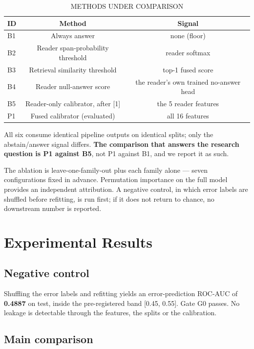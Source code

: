 \documentclass[conference]{IEEEtran}
\begin{document}
\begin{table}[t]\centering\caption{METHODS UNDER COMPARISON}\label{tab:3}\footnotesize
\begin{tabular}{lcc}\hline
\textbf{ID} & \textbf{Method} & \textbf{Signal} \\ \hline
B1 & Always answer & none (floor) \\
B2 & Reader span-probability threshold & reader softmax \\
B3 & Retrieval similarity threshold & top-1 fused score \\
B4 & Reader null-answer score & the reader's own trained no-answer head \\
B5 & Reader-only calibrator, after [1] & the 5 reader features \\
P1 & Fused calibrator (evaluated) & all 16 features \\
\hline\end{tabular}\end{table}

All six consume identical pipeline outputs on identical splits; only the abstain/answer signal differs. \textbf{The comparison that answers the research question is P1 against B5}, not P1 against B1, and we report it as such.

The ablation is leave-one-family-out plus each family alone --- seven configurations fixed in advance. Permutation importance on the full model provides an independent attribution. A negative control, in which error labels are shuffled before refitting, is run first; if it does not return to chance, no downstream number is reported.

\section{Experimental Results}

\subsection{Negative control}

Shuffling the error labels and refitting yields an error-prediction ROC-AUC of \textbf{0.4887} on test, inside the pre-registered band [0.45, 0.55]. Gate G0 passes. No leakage is detectable through the features, the splits or the calibration.

\subsection{Main comparison}
\end{document}
